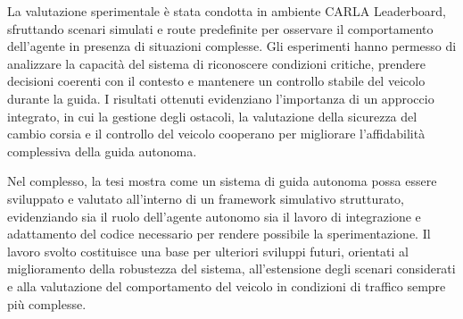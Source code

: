 La valutazione sperimentale è stata condotta in ambiente CARLA Leaderboard, sfruttando scenari simulati e route predefinite per osservare il comportamento dell'agente in presenza di situazioni complesse. Gli esperimenti hanno permesso di analizzare la capacità del sistema di riconoscere condizioni critiche, prendere decisioni coerenti con il contesto e mantenere un controllo stabile del veicolo durante la guida. I risultati ottenuti evidenziano l'importanza di un approccio integrato, in cui la gestione degli ostacoli, la valutazione della sicurezza del cambio corsia e il controllo del veicolo cooperano per migliorare l'affidabilità complessiva della guida autonoma.

Nel complesso, la tesi mostra come un sistema di guida autonoma possa essere sviluppato e valutato all'interno di un framework simulativo strutturato, evidenziando sia il ruolo dell'agente autonomo sia il lavoro di integrazione e adattamento del codice necessario per rendere possibile la sperimentazione. Il lavoro svolto costituisce una base per ulteriori sviluppi futuri, orientati al miglioramento della robustezza del sistema, all'estensione degli scenari considerati e alla valutazione del comportamento del veicolo in condizioni di traffico sempre più complesse.